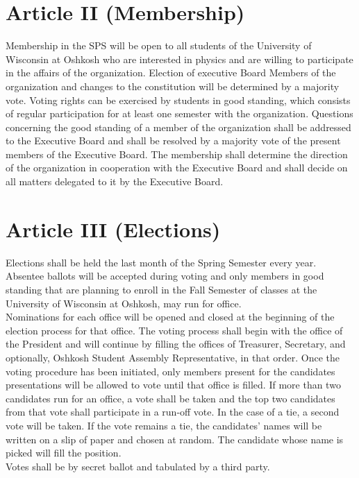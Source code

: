 \documentclass[12pt,a4paper]{article}
\begin{document}
\section{Article II (Membership)}
Membership in the SPS will be open to all students of the University of Wisconsin at Oshkosh who are interested in physics and are willing to participate in the affairs of the organization. Election of executive Board Members of the organization and changes to the constitution will be determined by a majority vote. Voting rights can be exercised by students in good standing, which consists of regular participation for at least one semester with the organization. Questions concerning the good standing of a member of the organization shall be addressed to the Executive Board and shall be resolved by a majority vote of the present members of the Executive Board. The membership shall determine the direction of the organization in cooperation with the Executive Board and shall decide on all matters delegated to it by the Executive Board. 

\section{Article III (Elections)}
Elections shall be held the last month of the Spring Semester every year. Absentee ballots will be accepted during voting and only members in good standing that are planning to enroll in the Fall Semester of classes at the University of Wisconsin at Oshkosh, may run for office. \\

Nominations for each office will be opened and closed at the beginning of the election process for that office. The voting process shall begin with the office of the President and will continue by filling the offices of Treasurer, Secretary, and  optionally, Oshkosh Student Assembly Representative, in that order. Once the voting procedure has been initiated, only members present for the candidates presentations will be allowed to vote until that office is filled. If more than two candidates run for an office, a vote shall be taken and the top two candidates from that vote shall participate in a run-off vote. In the case of a tie, a second vote will be taken. If the vote remains a tie, the candidates’ names will be written on a slip of paper and chosen at random. The candidate whose name is picked will fill the position. \\

Votes shall be by secret ballot and tabulated by a third party. 
\end{document}
